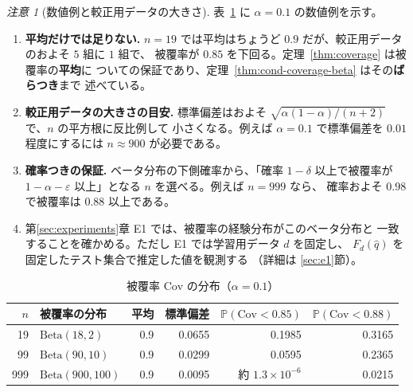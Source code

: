 \documentclass[a4paper,11pt]{jsarticle}
\theoremstyle{definition}
\theoremstyle{plain}
\theoremstyle{remark}
\newtheorem{remark}[definition]{注意}
\newcommand{\Prob}{\mathbb{P}}
\newcommand{\qhat}{\hat{q}}
\begin{document}
\begin{remark}[数値例と較正用データの大きさ]
  \label{rem:cond-coverage-size}
  \leavevmode  %
  表~\ref{tab:cond-coverage} に $\alpha=0.1$ の数値例を示す。
  \begin{enumerate}
    \item \textbf{平均だけでは足りない.}
      $n=19$ では平均はちょうど $0.9$ だが、較正用データのおよそ $5$ 組に $1$ 組で、
      被覆率が $0.85$ を下回る。定理~\ref{thm:coverage} は被覆率の\textbf{平均}に
      ついての保証であり、定理~\ref{thm:cond-coverage-beta} はその\textbf{ばらつき}まで
      述べている。
    \item \textbf{較正用データの大きさの目安.}
      標準偏差はおよそ $\sqrt{\alpha(1-\alpha)/(n+2)}$ で、$n$ の平方根に反比例して
      小さくなる。例えば $\alpha=0.1$ で標準偏差を $0.01$ 程度にするには
      $n\approx900$ が必要である。
    \item \textbf{確率つきの保証.}
      ベータ分布の下側確率から、「確率 $1-\delta$ 以上で被覆率が
      $1-\alpha-\varepsilon$ 以上」となる $n$ を選べる。例えば $n=999$ なら、
      確率およそ $0.98$ で被覆率は $0.88$ 以上である。
    \item 第\ref{sec:experiments}章 E1 では、被覆率の経験分布がこのベータ分布と
      一致することを確かめる。ただし E1 では学習用データ $d$ を固定し、
      $F_d(\qhat)$ を固定したテスト集合で推定した値を観測する
      （詳細は \ref{sec:e1}節）。
  \end{enumerate}
\end{remark}

\begin{table}[htbp]
  \centering
  \caption{被覆率 $\mathrm{Cov}$ の分布（$\alpha=0.1$）}
  \label{tab:cond-coverage}
  \begin{tabular}{rlrrrr}
    \toprule
    $n$ & 被覆率の分布 & 平均 & 標準偏差
      & $\Prob(\mathrm{Cov}<0.85)$ & $\Prob(\mathrm{Cov}<0.88)$ \\
    \midrule
    19  & $\mathrm{Beta}(18,2)$    & 0.9 & 0.0655 & 0.1985 & 0.3165 \\
    99  & $\mathrm{Beta}(90,10)$   & 0.9 & 0.0299 & 0.0595 & 0.2365 \\
    999 & $\mathrm{Beta}(900,100)$ & 0.9 & 0.0095 & 約 $1.3\times10^{-6}$ & 0.0215 \\
    \bottomrule
  \end{tabular}
\end{table}
\end{document}
